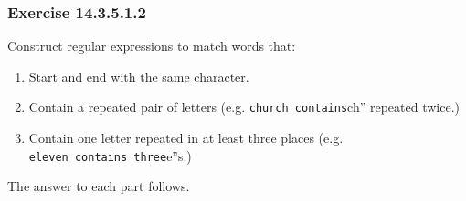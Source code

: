 \documentclass[]{book}
\providecommand{\tightlist}{%
  \setlength{\itemsep}{0pt}\setlength{\parskip}{0pt}}
\theoremstyle{plain}
\theoremstyle{remark}
\begin{document}
\hypertarget{exercise-14.3.5.1.2}{%
\subsubsection*{\texorpdfstring{Exercise {14.3.5.1.2}}{Exercise 14.3.5.1.2}}\label{exercise-14.3.5.1.2}}

Construct regular expressions to match words that:

\begin{enumerate}
\def\labelenumi{\arabic{enumi}.}
\tightlist
\item
  Start and end with the same character.
\item
  Contain a repeated pair of letters (e.g. \texttt{church\textquotesingle{}\textquotesingle{}\ contains}ch'' repeated twice.)
\item
  Contain one letter repeated in at least three places (e.g. \texttt{eleven\textquotesingle{}\textquotesingle{}\ contains\ three}e''s.)
\end{enumerate}

The answer to each part follows.
\end{document}
